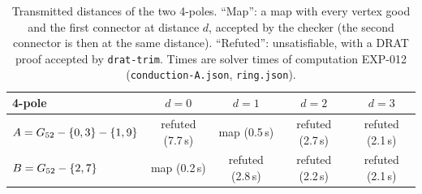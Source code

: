 \begin{table}[t]\centering\small
\begin{tabular}{lcccc}
\toprule
4-pole & $d = 0$ & $d = 1$ & $d = 2$ & $d = 3$ \\
\midrule
$A = G_{52} - \{0,3\} - \{1,9\}$ & refuted (7.7\,s) & map (0.5\,s) & refuted (2.7\,s) & refuted (2.1\,s) \\
$B = G_{52} - \{2,7\}$ & map (0.2\,s) & refuted (2.8\,s) & refuted (2.2\,s) & refuted (2.1\,s) \\
\bottomrule
\end{tabular}
\caption{Transmitted distances of the two 4-poles. ``Map'': a map with every vertex good and the first connector at distance $d$, accepted by the checker (the second connector is then at the same distance). ``Refuted'': unsatisfiable, with a DRAT proof accepted by \texttt{drat-trim}. Times are solver times of computation EXP-012 (\texttt{conduction-A.json}, \texttt{ring.json}).}\label{tab:sets}
\end{table}
